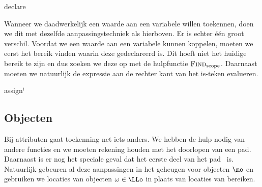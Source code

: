 \begin{NSAxiom}{declare}
  \begin{prooftree}
  \end{prooftree}
  \begin{NSConditions}
  \end{NSConditions}
\end{NSAxiom}

Wanneer we daadwerkelijk een waarde aan een variabele willen toekennen, doen we dit met dezelfde aanpassingstechniek als hierboven. Er is echter één groot verschil. Voordat we een waarde aan een variabele kunnen koppelen, moeten we eerst het bereik vinden waarin deze gedeclareerd is. Dit hoeft niet het huidige bereik te zijn en dus zoeken we deze op met de hulpfunctie $\textsc{Find}_\text{scope}$. Daarnaast moeten we natuurlijk de expressie aan de rechter kant van het is-teken evalueren.

\begin{NSAxiom}{assign$^\text{i}$}
  \begin{prooftree}
  \end{prooftree}
  \begin{NSConditions}
  \end{NSConditions}
\end{NSAxiom}

\subsection{Objecten}

Bij attributen gaat toekenning net iets anders. We hebben de hulp nodig van andere functies en we moeten rekening houden met het doorlopen van een pad. Daarnaast is er nog het speciale geval dat het eerste deel van het pad \THIS\ is. Natuurlijk gebeuren al deze aanpassingen in het geheugen voor objecten $\mo$ en gebruiken we locaties van objecten $\omega\in\LLo$ in plaats van locaties van bereiken.

